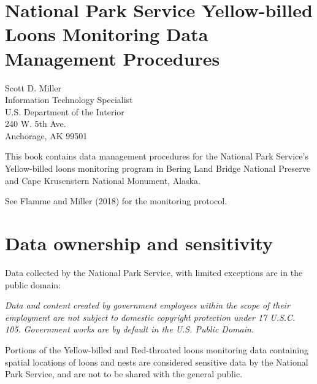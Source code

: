 \documentclass[
  letterpaper,
  DIV=11,
  numbers=noendperiod]{scrreprt}
\author{}
\date{}
\renewcommand*\contentsname{Table of contents}
\newcommand\contentsname{Table of contents}
\begin{document}
\renewcommand*\contentsname{Table of contents}
{
\hypersetup{linkcolor=}
\setcounter{tocdepth}{2}
\tableofcontents
}


\chapter*{National Park Service Yellow-billed Loons Monitoring Data
Management
Procedures}\label{national-park-service-yellow-billed-loons-monitoring-data-management-procedures}


Scott D. Miller\\
Information Technology Specialist\\
U.S. Department of the Interior\\
240 W. 5th Ave.\\
Anchorage, AK 99501

This book contains data management procedures for the National Park
Service's Yellow-billed loons monitoring program in Bering Land Bridge
National Preserve and Cape Krusenstern National Monument, Alaska.

See Flamme and Miller (2018) for the monitoring protocol.


\chapter{Data ownership and
sensitivity}\label{data-ownership-and-sensitivity}

Data collected by the National Park Service, with limited exceptions are
in the public domain:

\emph{Data and content created by government employees within the scope
of their employment are not subject to domestic copyright protection
under 17 U.S.C. 105. Government works are by default in the U.S. Public
Domain.}

Portions of the Yellow-billed and Red-throated loons monitoring data
containing spatial locations of loons and nests are considered sensitive
data by the National Park Service, and are not to be shared with the
general public.
\end{document}
